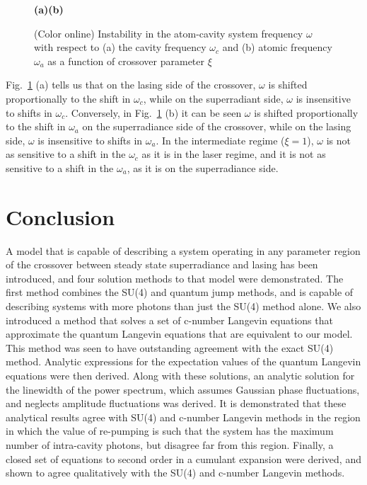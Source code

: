 \documentclass[aps,prl,twocolumn,
superscriptaddress,groupedaddress]{revtex4}
\begin{document}
\begin{figure}
\begin{center}
\hspace{2mm} \textbf{(a)}\hspace{39mm}\textbf{(b)} \hspace{35mm}
\end{center}
\caption{(Color online) Instability in the atom-cavity system frequency
$\omega$ with respect to (a) the cavity frequency $\omega_c$ and (b)
atomic frequency $\omega_a$ as a function of crossover parameter $\xi$}
\label{CavityInstability}
\end{figure}
Fig.~\ref{CavityInstability} (a) tells us that on the lasing side of the
crossover, $\omega$ is shifted proportionally to the shift in
$\omega_c$, while on the superradiant side, $\omega$ is insensitive to
shifts in $\omega_c$.  Conversely, in Fig.~\ref{CavityInstability} (b)
it can be seen $\omega$ is shifted proportionally to the shift in
$\omega_a$ on the superradiance side of the crossover, while on the
lasing side, $\omega$ is insensitive to shifts in $\omega_a$. In the
intermediate regime ($\xi=1$), $\omega$ is not as sensitive to a shift
in the $\omega_c$ as it is in the laser regime, and it is not as
sensitive to a shift in the $\omega_a$, as it is on the superradiance
side.


\section{Conclusion}

A model that is capable of describing a system operating in any
parameter region of the crossover between steady state superradiance and
lasing has been introduced, and four solution methods to that model were
demonstrated. The first method combines the SU(4) and quantum jump
methods, and is capable of describing systems with more photons than
just the SU(4) method alone.  We also introduced a method that solves a
set of c-number Langevin equations that approximate the quantum Langevin
equations that are equivalent to our model. This method was seen to have
outstanding agreement with the exact SU(4) method. Analytic expressions
for the expectation values of the quantum Langevin equations were then
derived. Along with these solutions, an analytic solution for the
linewidth of the power spectrum, which assumes Gaussian phase
fluctuations, and neglects amplitude fluctuations was derived. It is
demonstrated that these analytical results agree with SU(4) and c-number
Langevin methods in the region in which the value of re-pumping is such
that the system has the maximum number of intra-cavity photons, but
disagree far from this region. Finally, a closed set of equations to
second order in a cumulant expansion were derived, and shown to agree
qualitatively with the SU(4) and c-number Langevin methods.
\end{document}
